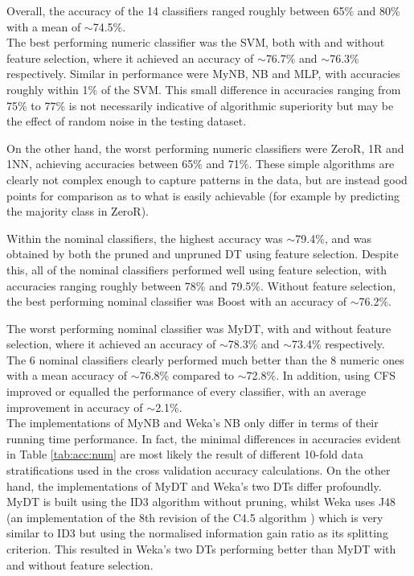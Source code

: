 Overall, the accuracy of the 14 classifiers ranged roughly between 65\% and 80\% with a mean of $\sim$74.5\%. \\

The best performing numeric classifier was the SVM, both with and without feature selection, where it achieved an accuracy of $\sim$76.7\% and $\sim$76.3\% respectively. Similar in performance were MyNB, NB and MLP, with accuracies roughly within 1\% of the SVM. This small difference in accuracies ranging from 75\% to 77\% is not necessarily indicative of algorithmic superiority but may be the effect of random noise in the testing dataset.

On the other hand, the worst performing numeric classifiers were ZeroR, 1R and 1NN, achieving accuracies between 65\% and 71\%. These simple algorithms are clearly not complex enough to capture patterns in the data, but are instead good points for comparison as to what is easily achievable (for example by predicting the majority class in ZeroR).

Within the nominal classifiers, the highest accuracy was $\sim$79.4\%, and was obtained by both the pruned and unpruned DT using feature selection. Despite this, all of the nominal classifiers performed well using feature selection, with accuracies ranging roughly between 78\% and 79.5\%. Without feature selection, the best performing nominal classifier was Boost with an accuracy of $\sim$76.2\%.

The worst performing nominal classifier was MyDT, with and without feature selection, where it achieved an accuracy of $\sim$78.3\% and $\sim$73.4\% respectively.
\\

The 6 nominal classifiers clearly performed much better than the 8 numeric ones with a mean accuracy of $\sim$76.8\% compared to $\sim$72.8\%. In addition, using CFS improved or equalled the performance of every classifier, with an average improvement in accuracy of $\sim$2.1\%. \\


The implementations of MyNB and Weka's NB only differ in terms of their running time performance. In fact, the minimal differences in accuracies evident in Table \ref{tab:acc:num} are most likely the result of different 10-fold data stratifications used in the cross validation accuracy calculations. On the other hand, the implementations of MyDT and Weka's two DTs differ profoundly. MyDT is built using the ID3 algorithm without pruning, whilst Weka uses J48 (an implementation of the 8th revision of the C4.5 algorithm \cite{weka}) which is very similar to ID3 but using the normalised information gain ratio as its splitting criterion. This resulted in Weka's two DTs performing better than MyDT with and without feature selection.


